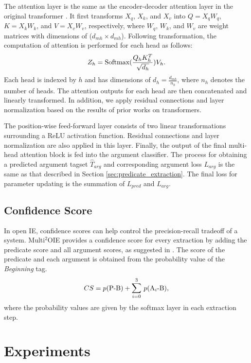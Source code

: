 \documentclass[11pt,a4paper]{article}
\begin{document}
The attention layer is the same as the encoder-decoder attention layer in the original transformer \citep{10.5555/3295222.3295349}.
It first transforms $X_q$, $X_k$, and $X_v$ into $Q=X_qW_q$, $K=X_kW_k$, and $V=X_vW_v$, respectively, where $W_q$, $W_k$, and $W_v$ are weight matrices with dimensions of ($d_{mh} \times d_{mh}$).
Following transformation, the computation of attention is performed for each head as follows:
\begin{equation}
\label{eq:2}
Z_h = \text{Softmax}(\frac{Q_h K^{T}_h}{\sqrt{d_h}})V_h \\.
\end{equation}
Each head is indexed by $h$ and has dimensions of $d_h=\frac{d_{mh}}{n_h}$, where $n_h$ denotes the number of heads.
The attention outputs for each head are then concatenated and linearly transformed.
In addition, we apply residual connections \citep{He2016DeepRL} and layer normalization \citep{Ba2016LayerN} based on the results of prior works on transformers.

The position-wise feed-forward layer consists of two linear transformations surrounding a ReLU activation function.
Residual connections and layer normalization are also applied in this layer.
Finally, the output of the final multi-head attention block is fed into the argument classifier.
The process for obtaining a predicted argument tagset $\hat{T}_{arg}$ and corresponding argument loss $L_{arg}$ is the same as that described in Section \ref{sec:predicate_extraction}.
The final loss for parameter updating is the summation of $L_{pred}$ and $L_{arg}$.

\subsection{Confidence Score}
\label{sec:confidence_score}
In open IE, confidence scores can help control the precision-recall tradeoff of a system.
Multi$^2$OIE provides a confidence score for every extraction by adding the predicate score and all argument scores, as suggested in \citet{Zhan2019SpanMF}.
The score of the predicate and each argument is obtained from the probability value of the \emph{Beginning} tag.
\begin{equation}
\label{eq:5}
CS = p(\text{P-B}) + \mathlarger{\sum}_{i=0}^{3}{\text{ }p(\text{A}_i\text{-B})},
\end{equation}
where the probability values are given by the softmax layer in each extraction step.

\section{Experiments}
\end{document}
